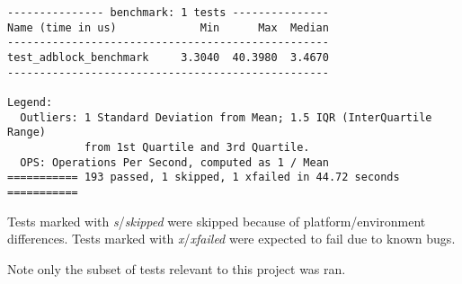 \begin{appendices}
\begin{verbatim}
--------------- benchmark: 1 tests ---------------
Name (time in us)             Min      Max  Median
--------------------------------------------------
test_adblock_benchmark     3.3040  40.3980  3.4670
--------------------------------------------------

Legend:
  Outliers: 1 Standard Deviation from Mean; 1.5 IQR (InterQuartile Range)
            from 1st Quartile and 3rd Quartile.
  OPS: Operations Per Second, computed as 1 / Mean
=========== 193 passed, 1 skipped, 1 xfailed in 44.72 seconds ===========
\end{verbatim}

Tests marked with \emph{s}/\emph{skipped} were skipped because of
platform/environment differences. Tests marked with \emph{x}/\emph{xfailed} were
expected to fail due to known bugs.

Note only the subset of tests relevant to this project was ran.

\renewcommand{\bibname}{\chapter{Literature and Sources}\vspace{-1em}}
\printbibliography
\end{appendices}
